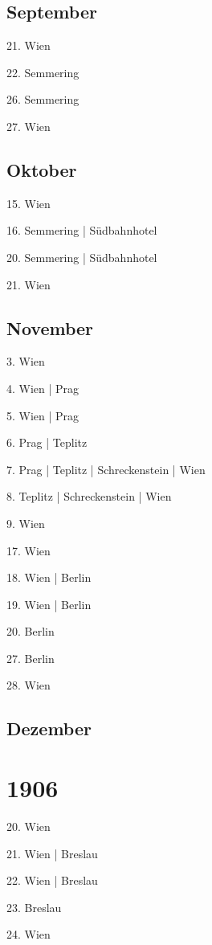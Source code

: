 \documentclass[twoside=false,titlepage=false,open=any, parskip=never, fontsize=10pt, headings=small, chapterprefix=false, appendixprefix=false, DIV=15]{scrbook}
\begin{document}
\begin{multicols}{3}
            \section*{September}
            21. Wien\par
            22. Semmering\par
            26. Semmering\par
            27. Wien\par
            \section*{Oktober}
            15. Wien\par
            16. Semmering | Südbahnhotel\par
            20. Semmering | Südbahnhotel\par
            21. Wien\par
            \section*{November}
            3. Wien\par
            4. Wien | Prag\par
            5. Wien | Prag\par
            6. Prag | Teplitz\par
            7. Prag | Teplitz | Schreckenstein | Wien\par
            8. Teplitz | Schreckenstein | Wien\par
            9. Wien\par
            17. Wien\par
            18. Wien | Berlin\par
            19. Wien | Berlin\par
            20. Berlin\par
            27. Berlin\par
            28. Wien\par
            \section*{Dezember}
            \chapter*{1906}
            20. Wien\par
            21. Wien | Breslau\par
            22. Wien | Breslau\par
            23. Breslau\par
            24. Wien\par

\end{multicols}
\end{document}
